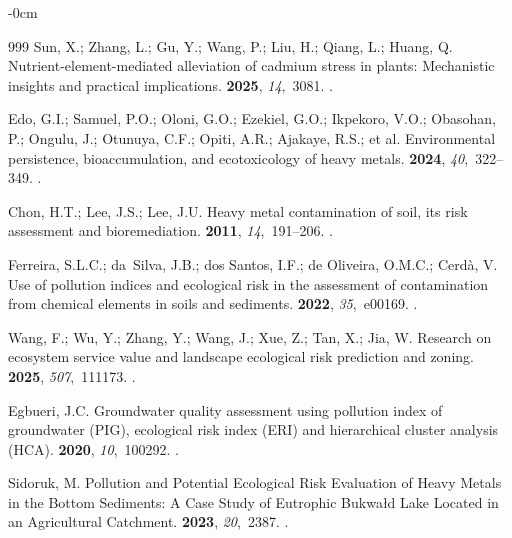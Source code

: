\documentclass[environremediat,article,accept,pdftex,oneauthor]{Definitions/mdpi}
\begin{document}
\begin{adjustwidth}{-\extralength}{0cm}
\begin{thebibliography}{999}
Sun, X.; Zhang, L.; Gu, Y.; Wang, P.; Liu, H.; Qiang, L.; Huang, Q.
\newblock Nutrient-element-mediated alleviation of cadmium stress in plants:
  Mechanistic insights and practical implications.
 {\bf 2025}, {\em 14},~3081.
.

Edo, G.I.; Samuel, P.O.; Oloni, G.O.; Ezekiel, G.O.; Ikpekoro, V.O.; Obasohan, P.; Ongulu, J.; Otunuya, C.F.; Opiti, A.R.; Ajakaye, R.S.; et al.
\newblock Environmental persistence, bioaccumulation, and ecotoxicology of
  heavy metals.
 {\bf 2024}, {\em 40},~322--349.
.

Chon, H.T.; Lee, J.S.; Lee, J.U.
\newblock Heavy metal contamination of soil, its risk assessment and
  bioremediation.
 {\bf 2011}, {\em 14},~191--206.
.

Ferreira, S.L.C.; da~Silva, J.B.; dos Santos, I.F.; de Oliveira, O.M.C.; Cerd{\`a}, V.
\newblock Use of pollution indices and ecological risk in the assessment of
  contamination from chemical elements in soils and sediments.
 {\bf 2022}, {\em
  35},~e00169.
.

Wang, F.; Wu, Y.; Zhang, Y.; Wang, J.; Xue, Z.; Tan, X.; Jia, W.
\newblock Research on ecosystem service value and landscape ecological risk
  prediction and zoning.
 {\bf 2025}, {\em 507},~111173.
.

Egbueri, J.C.
\newblock Groundwater quality assessment using pollution index of groundwater
  (PIG), ecological risk index (ERI) and hierarchical cluster analysis (HCA).
 {\bf 2020}, {\em
  10},~100292.
.

Sidoruk, M.
\newblock Pollution and Potential Ecological Risk Evaluation of Heavy Metals in
  the Bottom Sediments: A Case Study of Eutrophic Bukwałd Lake Located in an
  Agricultural Catchment.
 {\bf 2023}, {\em 20},~2387.
.


\end{thebibliography}
\end{adjustwidth}
\end{document}

